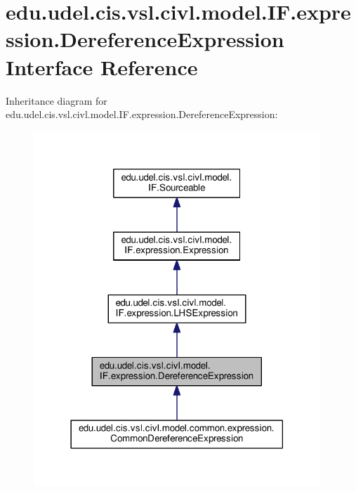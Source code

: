 \hypertarget{interfaceedu_1_1udel_1_1cis_1_1vsl_1_1civl_1_1model_1_1IF_1_1expression_1_1DereferenceExpression}{}\section{edu.\+udel.\+cis.\+vsl.\+civl.\+model.\+I\+F.\+expression.\+Dereference\+Expression Interface Reference}
\label{interfaceedu_1_1udel_1_1cis_1_1vsl_1_1civl_1_1model_1_1IF_1_1expression_1_1DereferenceExpression}


Inheritance diagram for edu.\+udel.\+cis.\+vsl.\+civl.\+model.\+I\+F.\+expression.\+Dereference\+Expression\+:
\nopagebreak
\begin{figure}[H]
\begin{center}
\leavevmode
\includegraphics[width=306pt]{interfaceedu_1_1udel_1_1cis_1_1vsl_1_1civl_1_1model_1_1IF_1_1expression_1_1DereferenceExpression__inherit__graph}
\end{center}
\end{figure}



